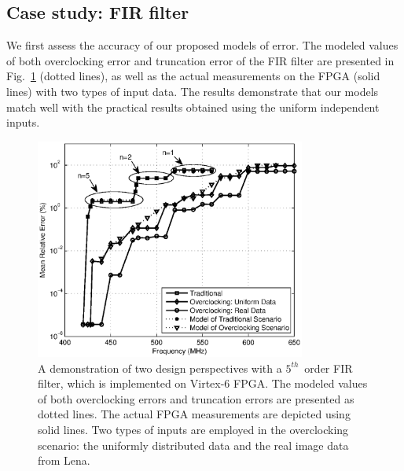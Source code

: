 \documentclass[journal]{IEEEtran}
\begin{document}
\subsection{Case study: FIR filter}
We first assess the accuracy of our proposed models of error. The modeled values of both overclocking error and truncation error of the FIR filter are presented in Fig.~\ref{FIR} (dotted lines), as well as the actual measurements on the FPGA (solid lines) with two types of input data. The results demonstrate that our models match well with the practical results obtained using the uniform independent inputs.
\begin{figure}[htbp]
  \centering
  \includegraphics[width=3.5in]{./Figures/Exp/FIR/FIR_Error_New_TCAD.eps}
  \caption{A demonstration of two design perspectives with a $5^{th}$~order FIR filter, which is implemented on Virtex-6 FPGA. The modeled values of both overclocking errors and truncation errors are presented as dotted lines. The actual FPGA measurements are depicted using solid lines. Two types of inputs are employed in the overclocking scenario: the uniformly distributed data and the real image data from Lena.}
  \label{FIR}
\end{figure}
\end{document}
